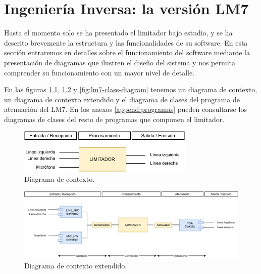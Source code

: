 \chapter{Ingeniería Inversa: la versión LM7} \label{cap:capitulo3_II}

Hasta el momento solo se ha presentado el limitador bajo estudio, y se ha descrito brevemente la estructura y las funcionalidades de su software. En esta sección entraremos en detalles sobre el funcionamiento del software mediante la presentación de diagramas que ilustren el diseño del sistema y nos permita comprender su funcionamiento con un mayor nivel de detalle.

En las figuras \ref{fig:lm7_overview}, \ref{fig:lm7_overview_extended} y \ref{fig:lm7-class-diagram} tenemos un diagrama de contexto, un diagrama de contexto extendido y el diagrama de clases del programa de atenuación del LM7. En los anexos \ref{append:programas} pueden consultarse los diagramas de clases del resto de programas que componen el limitador.

\begin{figure}[h]
    \centering
    \includegraphics[width=0.75\textwidth]{figuras/lm7_overview.pdf}
    \caption{Diagrama de contexto.}
    \label{fig:lm7_overview}
\end{figure}

\begin{figure}[h]
    \centering
    \includegraphics[scale=0.75, angle=90]{figuras/lm7_overview_extended.pdf}
    \caption{Diagrama de contexto extendido.}
    \label{fig:lm7_overview_extended}
\end{figure}


